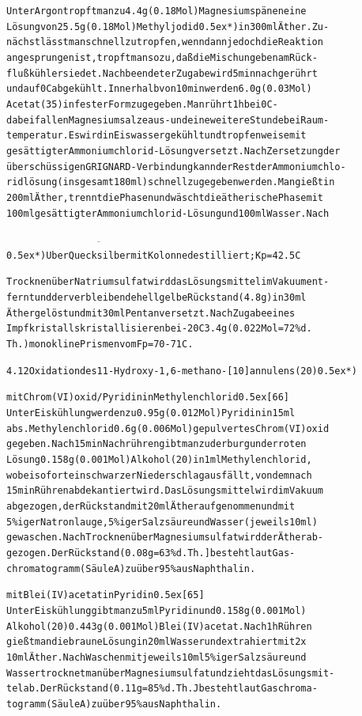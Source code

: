 \documentclass[a4paper,11pt]{article}
\begin{document}
\begin{alltt}
Unter Argon tropft man zu 4.4 g (0.18 Mol) Magnesiumspänen eine
Lösung von 25.5 g (0.18 Mol) Methyljodid\leavevmode\raise0.5ex\hbox{*}) in 300 ml Äther. Zu-
nächst lässt man schnell zutropfen, wenn dann jedoch die Reaktion
angesprungen ist, tropft man so zu, daß die Mischung eben am Rück-
flußkühler siedet. Nach beendeter Zugabe wird 5 min nachgerührt
und auf 0\degree{}C abgekühlt. Innerhalb von 10 min werden 6.0 g (0.03 Mol)
Acetat (35) in fester Form zugegeben. Man rührt 1 h bei 0\degree{}C -
dabei fallen Magnesiumsalze aus - und eine weitere Stunde bei Raum-
temperatur. Es wird in Eiswasser gekühlt und tropfenweise mit
gesättigter Ammoniumchlorid-Lösung versetzt. Nach Zersetzung der
überschüssigen GRIGNARD-Verbindung kann der Rest der Ammoniumchlo-
ridlösung (insgesamt 180 ml) schnell zugegeben werden. Man gießt in
200 ml Äther, trennt die Phasen und wäscht die ätherische Phase mit
100 ml gesättigter Ammoniumchlorid-Lösung und 100 ml Wasser. Nach

\(\overline{\hspace{7cm}}\)
\leavevmode\raise0.5ex\hbox{*}) Uber Quecksilber mit Kolonne destilliert; Kp = 42.5\degree{}C

\newpage
{}


Trocknen über Natriumsulfat wird das Lösungsmittel im Vakuum ent-
fernt und der verbleibende hellgelbe Rückstand (4.8 g) in 30 ml
Äther gelöst und mit 30 ml Pentan versetzt. Nach Zugabe eines
Impfkristalls kristallisieren bei -20\degree{}C 3.4 g (0.022 Mol = 72 \% d.
Th.) monokline Prismen vom Fp = 70 - 71\degree{}C.


4.12 Oxidation des 11-Hydroxy-1,6-methano-[10]annulens (20) \leavevmode\raise0.5ex\hbox{*})

mit Chrom(VI)oxid/Pyridin in Methylenchlorid \raise0.5ex\hbox{[66]}
Unter Eiskühlung werden zu 0.95 g (0.012 Mol) Pyridin in 15 ml
abs. Methylenchlorid 0.6 g (0.006 Mol) gepulvertes Chrom(VI)oxid
gegeben. Nach 15 min Nachrühren gibt man zu der burgunderroten
Lösung 0.158 g (0.001 Mol) Alkohol (20) in 1 ml Methylenchlorid,
wobei sofort ein schwarzer Niederschlag ausfällt, von dem nach
15 min Rühren abdekantiert wird. Das Lösungsmittel wird im Vakuum
abgezogen, der Rückstand mit 20 ml Äther aufgenommen und mit
5 \%iger Natronlauge, 5\%iger Salzsäure und Wasser (jeweils 10 ml)
gewaschen. Nach Trocknen über Magnesiumsulfat wird der Äther ab-
gezogen. Der Rückstand (0.08 g = 63 \% d.Th.] besteht laut Gas-
chromatogramm (Säule A) zu über 95 \% aus Naphthalin.

mit Blei(IV)acetat in Pyridin \raise0.5ex\hbox{[65]}
Unter Eiskühlung gibt man zu 5 ml Pyridin und 0.158 g (0.001 Mol)
Alkohol (20) 0.443 g (0.001 Mol) Blei(IV)acetat. Nach 1 h Rühren
gießt man die braune Lösung in 20 ml Wasser und extrahiert mit 2 x
10 ml Äther. Nach Waschen mit jeweils 10 ml 5\%iger Salzsäure und
Wasser trocknet man über Magnesiumsulfat und zieht das Lösungsmit-
tel ab. Der Rückstand (0.11 g = 85 \% d.Th.J besteht laut Gaschroma-
togramm (Säule A) zu über 95 \% aus Naphthalin.


\end{alltt}
\end{document}
